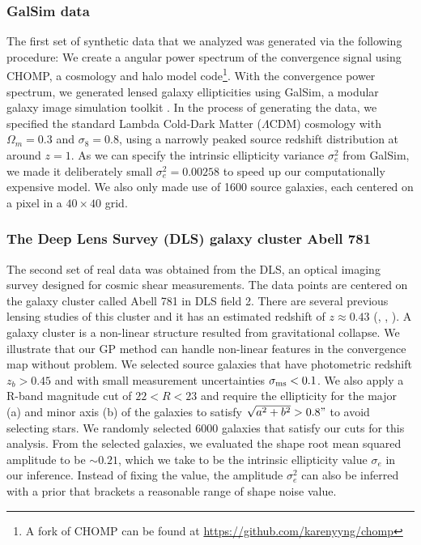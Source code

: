 \subsubsection{{\sc GalSim} data}
The first set of synthetic data that we analyzed was generated via the following procedure: 
We create a angular power spectrum of the convergence signal using {\sc
CHOMP}, a cosmology and halo model code\footnote{A fork of {\sc CHOMP} can be
found at \href{https://github.com/karenyyng/chomp}{https://github.com/karenyyng/chomp}}. 
With the convergence power spectrum, we generated lensed   
galaxy ellipticities using {\sc GalSim}, a modular galaxy image
simulation toolkit \citep{Rowe2015}.
In the process of generating the data, we specified 
the standard Lambda Cold-Dark Matter ($\Lambda$CDM) cosmology with $\Omega_m =
0.3$ and $\sigma_8 = 0.8$, using a narrowly peaked source redshift distribution
at around $z = 1$. As we can specify the intrinsic ellipticity variance
$\sigma_e^2$ from {\sc GalSim}, we made it deliberately small $\sigma_e^2 =
0.00258$ to speed up our computationally expensive model. 
We also only made use of 1600 source galaxies, each centered on a pixel in a 
$40 \times 40$ grid. 
 
\subsubsection{The Deep Lens Survey (DLS) galaxy cluster Abell 781}
The second set of real data was obtained from the DLS, an optical imaging survey 
designed for cosmic shear measurements.  The data points
are centered on the galaxy cluster called Abell 781 in DLS field 2.
There are several previous lensing studies of this cluster and it has an estimated redshift
of $z \approx 0.43$ (\citealt{Wittman2014}, \citealt{Cook2012}, \citealt{Sehgal2008}). 
A galaxy cluster is a
non-linear structure resulted from gravitational collapse. We illustrate that
our GP method can handle non-linear features in the convergence map without 
problem. We selected source galaxies that have photometric redshift $z_b >
0.45$ and with small measurement uncertainties $\sigma_{\rm ms} < 0.1$. We also apply  
a R-band magnitude cut of $22 < R < 23$ and require the ellipticity for the
major (a) and minor axis (b) of the galaxies to satisfy $\sqrt{a^2 + b^2} > 0.8"$ 
to avoid selecting stars. We randomly selected 6000 galaxies that satisfy our
cuts for this analysis. From the selected galaxies, we evaluated the shape
root mean squared amplitude to be $\sim 0.21$, which we take to be the
intrinsic ellipticity value $\sigma_e$ in our inference.
Instead of fixing the value, the amplitude
$\sigma_e^2$ can also be inferred with a prior that brackets a reasonable range of
shape noise value.  
 
